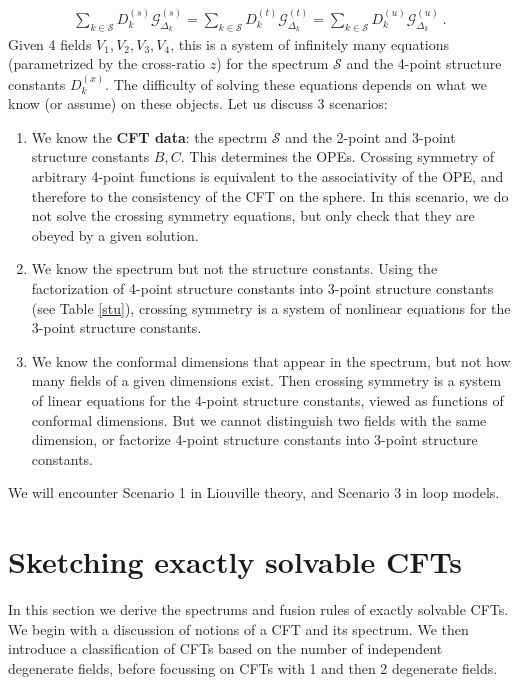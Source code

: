 \documentclass[12pt, a4paper]{article}
\theoremstyle{break}
\begin{document}
\begin{align}
 \boxed{\sum_{k\in\mathcal{S}} D_k^{(s)} \mathcal{G}^{(s)}_{\Delta_k} = \sum_{k\in\mathcal{S}} D_k^{(t)} \mathcal{G}^{(t)}_{\Delta_k} = \sum_{k\in\mathcal{S}} D_k^{(u)} \mathcal{G}^{(u)}_{\Delta_k}} \ . 
\end{align}
Given 4 fields $V_1,V_2,V_3,V_4$, this is a system of infinitely many equations (parametrized by the cross-ratio $z$) for the spectrum $\mathcal{S}$ and the 4-point structure constants $D_k^{(x)}$. The difficulty of solving these equations depends on what we know (or assume) on these objects. Let us discuss 3 scenarios:
\begin{enumerate}
 \item We know the \textbf{CFT data}: the spectrm $\mathcal{S}$ and the 2-point and 3-point structure constants $B,C$. This determines the OPEs. Crossing symmetry of arbitrary 4-point functions is equivalent to the associativity of the OPE, and therefore to the consistency of the CFT on the sphere. In this scenario, we do not solve the crossing symmetry equations, but only check that they are obeyed by a given solution.
 \item We know the spectrum but not the structure constants. Using the factorization of 4-point structure constants into 3-point structure constants (see Table \eqref{stu}), crossing symmetry is a system of nonlinear equations for the 3-point structure constants.
 \item We know the conformal dimensions that appear in the spectrum, but not how many fields of a given dimensions exist. Then crossing symmetry is a system of linear equations for the 4-point structure constants, viewed as functions of conformal dimensions. But we cannot distinguish two fields with the same dimension, or factorize 4-point structure constants into 3-point structure constants. 
\end{enumerate}
We will encounter Scenario 1 in Liouville theory, and Scenario 3 in loop models.


\section{Sketching exactly solvable CFTs}\label{sec:sesc}

In this section we derive the spectrums and fusion rules of exactly solvable CFTs. We begin with a discussion of notions of a CFT and its spectrum. We then introduce a classification of CFTs based on the number of independent degenerate fields, before focussing on CFTs with 1 and then 2 degenerate fields.
\end{document}
